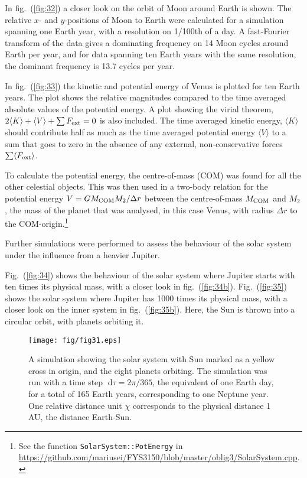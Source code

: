 \documentclass[a4paper,11pt]{article}
\newcommand{\diff}{\ensuremath{\; \text{d}}}
\begin{document}
In fig.~(\ref{fig:32}) a closer look on the orbit of Moon around Earth is shown. The relative $x$- and $y$-positions of Moon to Earth were calculated for a simulation spanning one Earth year, with a resolution on 1/100th of a day. A fast-Fourier transform of the data gives a dominating frequency on 14 Moon cycles around Earth per year, and for data spanning ten Earth years with the same resolution, the dominant frequency is 13.7 cycles per year. 

In fig.~(\ref{fig:33}) the kinetic and potential energy of Venus is plotted for ten Earth years. The plot shows the relative magnitudes compared to the time averaged absolute values of the potential energy. A plot showing the virial theorem, $2\langle K \rangle + \langle V \rangle + \sum F_{\rm ext} = 0$ is also included. The time averaged kinetic energy, $\langle K \rangle$ should contribute half as much as the time averaged potential energy $\langle V \rangle $ to a sum that goes to zero in the absence of any external, non-conservative forces $\sum \langle F_{\rm ext} \rangle$. 

To calculate the potential energy, the centre-of-mass (COM) was found for all the other celestial objects. This was then used in a two-body relation for the potential energy $V = G M_{\rm COM} M_2 / \Delta r$ between the centre-of-mass $M_{\rm COM}$ and $M_2$, the mass of the planet that was analysed, in this case Venus, with radius $\Delta r$ to the COM-origin.\footnote{See the function \texttt{SolarSystem::PotEnergy} in \url{https://github.com/mariusei/FYS3150/blob/master/oblig3/SolarSystem.cpp}.} 

Further simulations were performed to assess the behaviour of the solar system under the influence from a heavier Jupiter. 

Fig.~(\ref{fig:34}) shows the behaviour of the solar system where Jupiter starts with ten times its physical mass, with a closer look in fig.~(\ref{fig:34b}). Fig.~(\ref{fig:35}) shows the solar system where Jupiter has 1000 times its physical mass, with a closer look on the inner system in fig.~(\ref{fig:35b}). Here, the Sun is thrown into a circular orbit, with planets orbiting it.   

\begin{figure}[htb]
    \centering
    \texttt{[image: fig/fig31.eps]}
    \caption{A simulation showing the solar system with Sun marked as a yellow cross in origin, and the eight planets orbiting. The simulation was run with a time step $\diff \tau = 2\pi/365$, the equivalent of one Earth day, for a total of 165 Earth years, corresponding to one Neptune year. One relative distance unit $\chi$ corresponds to the physical distance 1 AU, the distance Earth-Sun. }
    \label{fig:31}
\end{figure}
\end{document}
